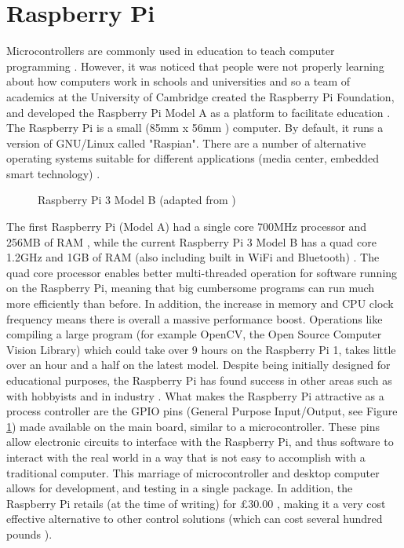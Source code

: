 \documentclass[twoside,a4]{report}
\def\br{\newline \newline \noindent}
\begin{document}
	\section{Raspberry Pi} %
	\noindent
	Microcontrollers are commonly used in education to teach computer programming \cite{backmcedu1, backmcedu2}. However, it was noticed that people were not properly learning about how computers work in schools and universities and so a team of academics at the University of Cambridge created the Raspberry Pi Foundation, and developed the Raspberry Pi Model A as a platform to facilitate education \cite{pihistory}. The Raspberry Pi is a small (85mm x 56mm \cite{pi3mechdraw}) computer. By default, it runs a version of GNU/Linux called "Raspian". There are a number of alternative operating systems suitable for different applications (media center, embedded smart technology) \cite{piotheros}.  \newline
	\begin{figure}[!htb]
	\centering
	\caption{Raspberry Pi 3 Model B (adapted from  \cite{pi3info})}
	\label{pidia}
	\end{figure} \newline%
	The first Raspberry Pi (Model A) had a single core 700MHz processor and 256MB of RAM \cite{pi1info}, while the current Raspberry Pi 3 Model B has a quad core 1.2GHz and 1GB of RAM (also including built in WiFi and Bluetooth) \cite{pi3info}. The quad core processor enables better multi-threaded operation for software running on the Raspberry Pi, meaning that big cumbersome programs can run much more efficiently than before. In addition, the increase in memory and CPU clock frequency means there is overall a massive performance boost. Operations like compiling a large program (for example OpenCV, the Open Source Computer Vision Library) which could take over 9 hours \cite{pipowercompold} on the Raspberry Pi 1, takes little over an hour and a half \cite{pipowercompnew} on the latest model.\br
	Despite being initially designed for educational purposes, the Raspberry Pi has found success in other areas such as with hobbyists \cite{pihobbynotedu} and in industry \cite{pimorethanedu}. What makes the Raspberry Pi attractive as a process controller are the GPIO pins (General Purpose Input/Output, see Figure \ref{pidia}) made available on the main board, similar to a microcontroller. These pins allow electronic circuits to interface with the Raspberry Pi, and thus software to interact with the real world in a way that is not easy to accomplish with a traditional computer. This marriage of microcontroller and desktop computer allows for development, and testing in a single package. In addition, the Raspberry Pi retails (at the time of writing) for \pounds 30.00 \cite{picost}, making it a very cost effective alternative to other control solutions (which can cost several hundred pounds \cite{otherpcucost}). \br
\end{document}
